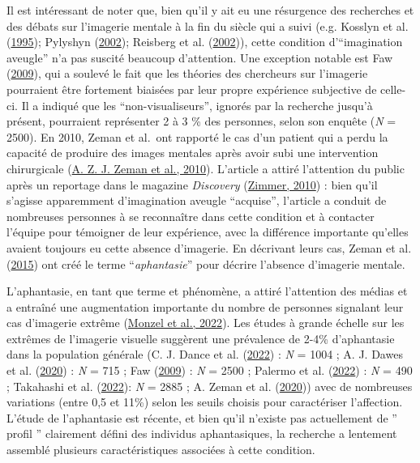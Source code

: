 \documentclass[
  12pt,
]{article}
\begin{document}
Il est intéressant de noter que, bien qu'il y ait eu une résurgence des
recherches et des débats sur l'imagerie mentale à la fin du siècle qui a
suivi (e.g. Kosslyn et al.
(\protect\hyperlink{ref-kosslynCognitiveNeuroscienceMental1995}{1995});
Pylyshyn
(\protect\hyperlink{ref-pylyshynMentalImagerySearch2002}{2002});
Reisberg et al.
(\protect\hyperlink{ref-reisbergIntuitionsIntrospectionsImagery2002}{2002})),
cette condition d'``imagination aveugle'' n'a pas suscité beaucoup
d'attention. Une exception notable est Faw
(\protect\hyperlink{ref-fawConflictingIntuitionsMay2009}{2009}), qui a
soulevé le fait que les théories des chercheurs sur l'imagerie
pourraient être fortement biaisées par leur propre expérience subjective
de celle-ci. Il a indiqué que les ``non-visualiseurs'', ignorés par la
recherche jusqu'à présent, pourraient représenter 2 à 3 \% des
personnes, selon son enquête (\emph{N} = 2500). En 2010, Zeman et
al.~ont rapporté le cas d'un patient qui a perdu la capacité de produire
des images mentales après avoir subi une intervention chirurgicale
(\protect\hyperlink{ref-zemanLossImageryPhenomenology2010}{A. Z. J.
Zeman et al., 2010}). L'article a attiré l'attention du public après un
reportage dans le magazine \emph{Discovery}
(\protect\hyperlink{ref-zimmerBrainLookDeep2010}{Zimmer, 2010}) : bien
qu'il s'agisse apparemment d'imagination aveugle ``acquise'', l'article
a conduit de nombreuses personnes à se reconnaître dans cette condition
et à contacter l'équipe pour témoigner de leur expérience, avec la
différence importante qu'elles avaient toujours eu cette absence
d'imagerie. En décrivant leurs cas, Zeman et al.
(\protect\hyperlink{ref-zemanLivesImageryCongenital2015}{2015}) ont créé
le terme ``\emph{aphantasie}'' pour décrire l'absence d'imagerie
mentale.

L'aphantasie, en tant que terme et phénomène, a attiré l'attention des
médias et a entraîné une augmentation importante du nombre de personnes
signalant leur cas d'imagerie extrême
(\protect\hyperlink{ref-monzelAphantasiaDysikonesiaAnauralia2022}{Monzel
et al., 2022}). Les études à grande échelle sur les extrêmes de
l'imagerie visuelle suggèrent une prévalence de 2-4\% d'aphantasie dans
la population générale (C. J. Dance et al.
(\protect\hyperlink{ref-dancePrevalenceAphantasiaImagery2022}{2022}) :
\emph{N} = 1004 ; A. J. Dawes et al.
(\protect\hyperlink{ref-dawesCognitiveProfileMultisensory2020}{2020}) :
\emph{N} = 715 ; Faw
(\protect\hyperlink{ref-fawConflictingIntuitionsMay2009}{2009}) :
\emph{N} = 2500 ; Palermo et al.
(\protect\hyperlink{ref-palermoCongenitalLackExtraordinary2022}{2022}) :
\emph{N} = 490 ; Takahashi et al.
(\protect\hyperlink{ref-takahashiDiversityAphantasiaRevealed2022}{2022}):
\emph{N} = 2885 ; A. Zeman et al.
(\protect\hyperlink{ref-zemanPhantasiaPsychologicalSignificance2020}{2020}))
avec de nombreuses variations (entre 0,5 et 11\%) selon les seuils
choisis pour caractériser l'affection. L'étude de l'aphantasie est
récente, et bien qu'il n'existe pas actuellement de '' profil ''
clairement défini des individus aphantasiques, la recherche a lentement
assemblé plusieurs caractéristiques associées à cette condition.
\end{document}
